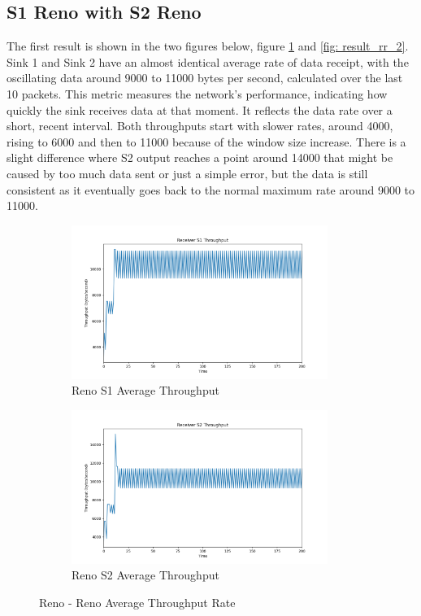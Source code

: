 \documentclass[12pt,a4paper]{report}
\begin{document}
\subsection*{S1 Reno with S2 Reno}
The first result is shown in the two figures below, figure \ref{fig: result_rr_1} and \ref{fig: result_rr_2}.  Sink 1 and Sink 2 have an almost identical average rate of data receipt, with the oscillating data around 9000 to 11000 bytes per second, calculated over the last 10 packets. This metric measures the network's performance, indicating how quickly the sink receives data at that moment. It reflects the data rate over a short, recent interval. Both throughputs start with slower rates, around 4000, rising to 6000 and then to 11000 because of the window size increase. There is a slight difference where S2 output reaches a point around 14000 that might be caused by too much data sent or just a simple error, but the data is still consistent as it eventually goes back to the normal maximum rate around 9000 to 11000.\\
\begin{figure}[!ht]
\begin{subfigure}{0.5\textwidth}
\includegraphics[width=1\linewidth, height=5cm]{Pictures/S1_Reno_Throughput.png} 
\caption{Reno S1 Average Throughput}
\end{subfigure}
\begin{subfigure}{0.5\textwidth}
\includegraphics[width=1\linewidth, height=5cm]{Pictures/S2_Reno_Throughput.png}
\caption{Reno S2 Average Throughput}
\end{subfigure}
\caption{Reno - Reno Average Throughput Rate}
\label{fig: result_rr_1}
\end{figure}
\end{document}
